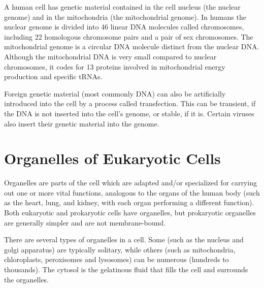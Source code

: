A human cell has genetic material contained in the cell nucleus (the nuclear genome) and in the mitochondria (the mitochondrial genome). In humans the nuclear genome is divided into 46 linear DNA molecules called chromosomes, including 22 homologous chromosome pairs and a pair of sex chromosomes. The mitochondrial genome is a circular DNA molecule distinct from the nuclear DNA. Although the mitochondrial DNA is very small compared to nuclear chromosomes, it codes for 13 proteins involved in mitochondrial energy production and specific tRNAs.

Foreign genetic material (most commonly DNA) can also be artificially introduced into the cell by a process called transfection. This can be transient, if the DNA is not inserted into the cell's genome, or stable, if it is. Certain viruses also insert their genetic material into the genome.

\hypertarget{organelles-of-eukaryotic-cells}{%
\section{Organelles of Eukaryotic Cells}\label{organelles-of-eukaryotic-cells}}

Organelles are parts of the cell which are adapted and/or specialized for carrying out one or more vital functions, analogous to the organs of the human body (such as the heart, lung, and kidney, with each organ performing a different function). Both eukaryotic and prokaryotic cells have organelles, but prokaryotic organelles are generally simpler and are not membrane-bound.

There are several types of organelles in a cell. Some (such as the nucleus and golgi apparatus) are typically solitary, while others (such as mitochondria, chloroplasts, peroxisomes and lysosomes) can be numerous (hundreds to thousands). The cytosol is the gelatinous fluid that fills the cell and surrounds the organelles.


